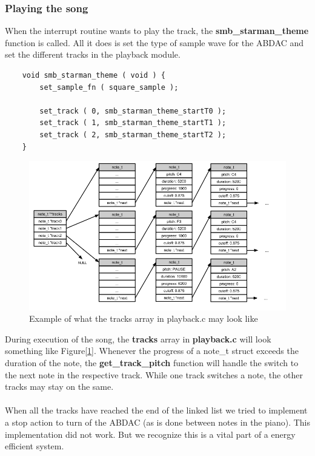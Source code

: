 \subsubsection{Playing the song}
When the interrupt routine wants to play the track, the \textbf{smb\_starman\_theme} function
is called. All it does is set the type of sample wave for the ABDAC and set the
different tracks in the playback module.
\begin{lstlisting}
	void smb_starman_theme ( void ) {
		set_sample_fn ( square_sample );

		set_track ( 0, smb_starman_theme_startT0 );
		set_track ( 1, smb_starman_theme_startT1 );
		set_track ( 2, smb_starman_theme_startT2 );
	}
\end{lstlisting}
\begin{figure}[h]
	\centerline{{\includegraphics[width=480px]{tracks_example.png}}}
	\caption{Example of what the tracks array in playback.c may look like}
	\label{tracks-example}
\end{figure}
During execution of the song, the \textbf{tracks} array in \textbf{playback.c}
will look something like Figure[\ref{tracks-example}].
Whenever the progress of a note\_t struct exceeds the duration of the note,
the \textbf{get\_track\_pitch} function will handle the switch
to the next note in the respective track. While one
track switches a note, the other tracks may stay on the same. \\
\\
When all the tracks have reached the end of the linked list we tried to implement a
stop action to turn of the ABDAC (as is done between notes in the piano). This implementation
did not work. But we recognize this is a vital part of a energy efficient system.
